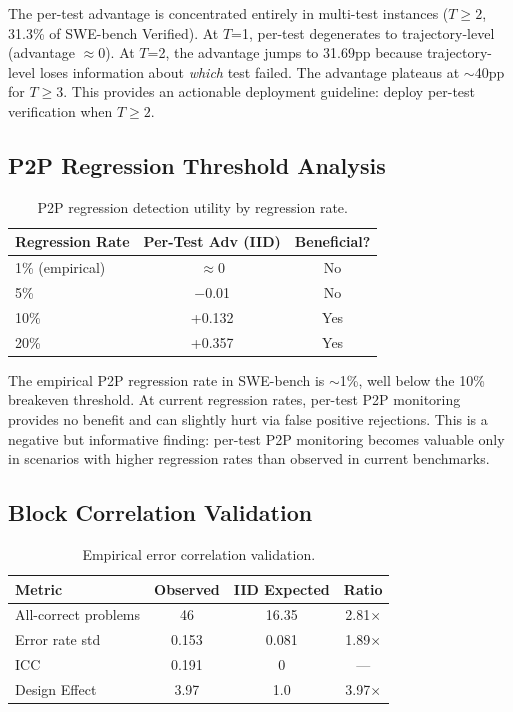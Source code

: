 \documentclass[11pt,a4paper]{article}
\begin{document}
The per-test advantage is concentrated entirely in multi-test instances ($T\geq2$, 31.3\% of SWE-bench Verified). At $T$=1, per-test degenerates to trajectory-level (advantage $\approx$0). At $T$=2, the advantage jumps to 31.69pp because trajectory-level loses information about \emph{which} test failed. The advantage plateaus at $\sim$40pp for $T\geq3$. This provides an actionable deployment guideline: deploy per-test verification when $T\geq2$.

\subsection{P2P Regression Threshold Analysis}
\label{sec:p2p}

\begin{table}[h]
\centering
\caption{P2P regression detection utility by regression rate.}
\label{tab:p2p}
\begin{tabular}{lcc}
\toprule
Regression Rate & Per-Test Adv (IID) & Beneficial? \\
\midrule
1\% (empirical) & $\approx$0 & No \\
5\% & $-$0.01 & No \\
10\% & +0.132 & Yes \\
20\% & +0.357 & Yes \\
\bottomrule
\end{tabular}
\end{table}

The empirical P2P regression rate in SWE-bench is $\sim$1\%, well below the 10\% breakeven threshold. At current regression rates, per-test P2P monitoring provides no benefit and can slightly hurt via false positive rejections. This is a negative but informative finding: per-test P2P monitoring becomes valuable only in scenarios with higher regression rates than observed in current benchmarks.

\subsection{Block Correlation Validation}
\label{sec:icc}

\begin{table}[h]
\centering
\caption{Empirical error correlation validation.}
\label{tab:icc}
\begin{tabular}{lccc}
\toprule
Metric & Observed & IID Expected & Ratio \\
\midrule
All-correct problems & 46 & 16.35 & 2.81$\times$ \\
Error rate std & 0.153 & 0.081 & 1.89$\times$ \\
ICC & 0.191 & 0 & --- \\
Design Effect & 3.97 & 1.0 & 3.97$\times$ \\
\bottomrule
\end{tabular}
\end{table}
\end{document}
